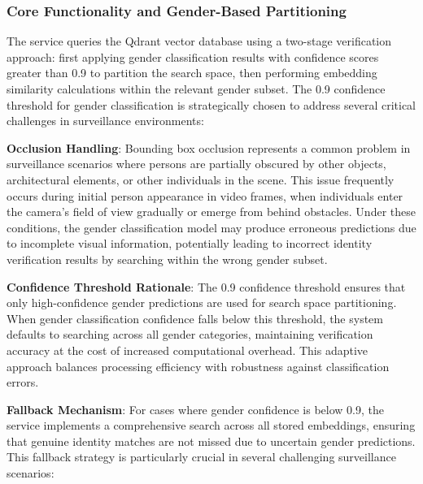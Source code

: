 \subsubsection{Core Functionality and Gender-Based Partitioning}

The service queries the Qdrant vector database using a two-stage verification approach: first applying gender classification results with confidence scores greater than 0.9 to partition the search space, then performing embedding similarity calculations within the relevant gender subset. The 0.9 confidence threshold for gender classification is strategically chosen to address several critical challenges in surveillance environments:

\textbf{Occlusion Handling}: Bounding box occlusion represents a common problem in surveillance scenarios where persons are partially obscured by other objects, architectural elements, or other individuals in the scene. This issue frequently occurs during initial person appearance in video frames, when individuals enter the camera's field of view gradually or emerge from behind obstacles. Under these conditions, the gender classification model may produce erroneous predictions due to incomplete visual information, potentially leading to incorrect identity verification results by searching within the wrong gender subset.

\textbf{Confidence Threshold Rationale}: The 0.9 confidence threshold ensures that only high-confidence gender predictions are used for search space partitioning. When gender classification confidence falls below this threshold, the system defaults to searching across all gender categories, maintaining verification accuracy at the cost of increased computational overhead. This adaptive approach balances processing efficiency with robustness against classification errors.

\textbf{Fallback Mechanism}: For cases where gender confidence is below 0.9, the service implements a comprehensive search across all stored embeddings, ensuring that genuine identity matches are not missed due to uncertain gender predictions. This fallback strategy is particularly crucial in several challenging surveillance scenarios:

